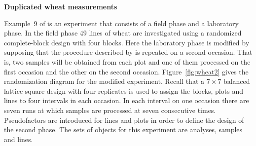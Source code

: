 \begin{flushleft}\Large\bf Duplicated wheat measurements
\end{flushleft}

\label{eg:Wheat2} Example~9 of \cite{BrBa:mult} is an experiment that
consists of a field phase and a laboratory phase. In the field phase 49
lines of wheat are investigated using a randomized complete-block
design with four blocks. Here the laboratory phase is modified by
supposing that the procedure described by \cite{BrBa:mult} is repeated
on a second occasion. That is, two samples will be obtained from each
plot and one of them processed on the first occasion and the other on
the second occasion. Figure~\ref{fig:wheat2} gives the randomization
diagram for the modified experiment. Recall that a $7 \times 7$
balanced lattice square design with four replicates is used to assign
the blocks, plots and lines to four intervals in each occasion. In each
interval on one occasion there are seven runs at which samples are
processed at seven consecutive times. Pseudofactors are introduced for
lines and plots in order to define the design of the second phase. The
sets of objects for this experiment are analyses, samples and lines.

